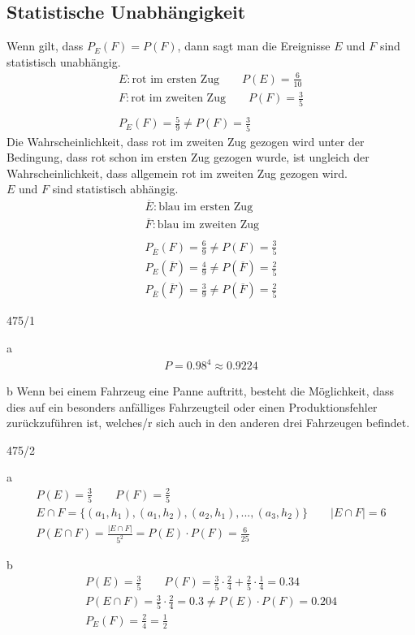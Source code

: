 \subsection{Statistische Unabhängigkeit}
Wenn gilt, dass $P_E(F) = P(F)$, dann sagt man die Ereignisse $E$ und $F$ sind statistisch unabhängig.
\begin{gather*}
  E \colon \text{rot im ersten Zug} \qquad P(E) = \frac{6}{10} \\
  F \colon \text{rot im zweiten Zug} \qquad P(F) = \frac{3}{5} \\\\
  P_E(F) = \frac{5}{9} \neq P(F) = \frac{3}{5}
\end{gather*}
Die Wahrscheinlichkeit, dass rot im zweiten Zug gezogen wird unter der Bedingung, dass rot schon im ersten Zug gezogen wurde, ist ungleich der Wahrscheinlichkeit, dass allgemein rot im zweiten Zug gezogen wird. \\
$E$ und $F$ sind statistisch abhängig. \\
\begin{gather*}
  \overline{E} \colon \text{blau im ersten Zug} \\
  \overline{F} \colon \text{blau im zweiten Zug} \\\\
  P_{\overline{E}}(F) = \frac{6}{9} \neq P(F) = \frac{3}{5} \\
  P_E(\overline{F}) = \frac{4}{9} \neq P(\overline{F}) = \frac{2}{5} \\
  P_{\overline{E}}(\overline{F}) = \frac{3}{9} \neq P(\overline{F}) = \frac{2}{5}
\end{gather*}
\begin{exercise}{475/1}
  \item [a]
  \begin{gather*}
    P = 0.98^4 \approx 0.9224
  \end{gather*}
  \item [b]
  Wenn bei einem Fahrzeug eine Panne auftritt, besteht die Möglichkeit, dass dies auf ein besonders anfälliges Fahrzeugteil oder einen Produktionsfehler zurückzuführen ist, welches/r sich auch in den anderen drei Fahrzeugen befindet.
\end{exercise}
\newpage
\begin{exercise}{475/2}
  \item [a]
  \begin{gather*}
    P(E) = \frac{3}{5} \qquad P(F) = \frac{2}{5} \\
    E \cap F = \{(a_1, h_1), (a_1, h_2), (a_2, h_1), ..., (a_3, h_2)\} \qquad |E \cap F| = 6 \\
    P(E \cap F) = \frac{|E \cap F|}{5^2} = P(E) \cdot P(F) = \frac{6}{25}
  \end{gather*}
  \item [b]
  \begin{gather*}
    P(E) = \frac{3}{5} \qquad P(F) = \frac{3}{5} \cdot \frac{2}{4} + \frac{2}{5} \cdot \frac{1}{4} = 0.34 \\
    P(E \cap F) = \frac{3}{5} \cdot \frac{2}{4} = 0.3 \neq P(E) \cdot P(F) = 0.204 \\
    P_E(F) = \frac{2}{4} = \frac{1}{2}
  \end{gather*}
\end{exercise}
